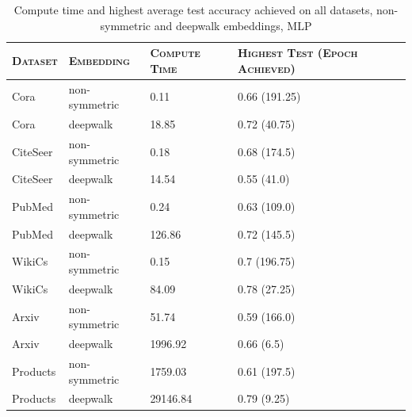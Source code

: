 \begin{table}\caption{Compute time and highest average test accuracy achieved on all datasets, non-symmetric and deepwalk embeddings, MLP}\begin{center}\begin{tabular}{ | m{2cm} | m{2cm}| m{2cm} | m{2cm} }\hline\textsc{Dataset} & \textsc{Embedding} & \textsc{Compute Time} & \textsc{Highest Test (Epoch Achieved)}\\\hline Cora & non-symmetric & 0.11 & 0.66 (191.25)\\\hline Cora & deepwalk & 18.85 & 0.72 (40.75)\\\hline CiteSeer & non-symmetric & 0.18 & 0.68 (174.5)\\\hline CiteSeer & deepwalk & 14.54 & 0.55 (41.0)\\\hline PubMed & non-symmetric & 0.24 & 0.63 (109.0)\\\hline PubMed & deepwalk & 126.86 & 0.72 (145.5)\\\hline WikiCs & non-symmetric & 0.15 & 0.7 (196.75)\\\hline WikiCs & deepwalk & 84.09 & 0.78 (27.25)\\\hline Arxiv & non-symmetric & 51.74 & 0.59 (166.0)\\\hline Arxiv & deepwalk & 1996.92 & 0.66 (6.5)\\\hline Products & non-symmetric & 1759.03 & 0.61 (197.5)\\\hline Products & deepwalk & 29146.84 & 0.79 (9.25)\\\hline\end{tabular}\end{center}\end{table}